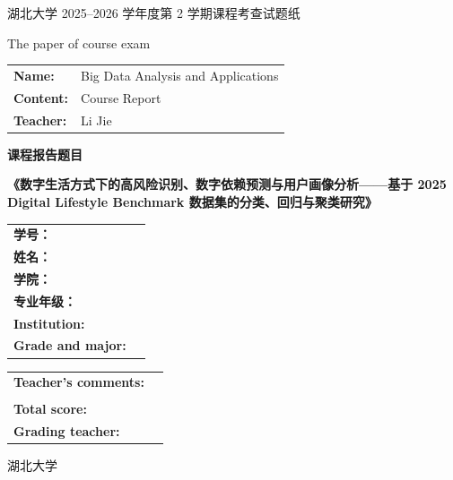\begin{titlepage}
\thispagestyle{empty}
\centering

{\Large 湖北大学 2025--2026 学年度第 2 学期课程考查试题纸\par}
\vspace{0.4cm}
{\large The paper of course exam\par}

\vspace{1.2cm}

\begin{tabular}{>{\bfseries}p{3.2cm}p{9.5cm}}
Name: & Big Data Analysis and Applications \\
Content: & Course Report \\
Teacher: & Li Jie \\
\end{tabular}

\vspace{1.4cm}

{\Large\bfseries 课程报告题目\par}
\vspace{0.6cm}
{\large\bfseries
《数字生活方式下的高风险识别、数字依赖预测与用户画像分析——基于 2025 Digital Lifestyle Benchmark 数据集的分类、回归与聚类研究》\par}

\vfill

\begingroup
\renewcommand{\arraystretch}{1.6}
\begin{tabular}{>{\bfseries}p{4.1cm}p{6.9cm}}
学号： & \underline{\hspace{6.4cm}} \\
姓名： & \underline{\hspace{6.4cm}} \\
学院： & \underline{\hspace{6.4cm}} \\
专业年级： & \underline{\hspace{6.4cm}} \\
Institution: & \underline{\hspace{6.4cm}} \\
Grade and major: & \underline{\hspace{6.4cm}} \\
\end{tabular}
\endgroup

\vspace{0.9cm}

\begingroup
\renewcommand{\arraystretch}{1.6}
\begin{tabular}{>{\bfseries}p{5cm}p{6cm}}
Teacher's comments: & \underline{\hspace{5.8cm}} \\
 & \underline{\hspace{5.8cm}} \\
Total score: & \underline{\hspace{5.8cm}} \\
Grading teacher: & \underline{\hspace{5.8cm}} \\
\end{tabular}
\endgroup

\vspace{0.9cm}

{\large 湖北大学\par}

\end{titlepage}
\clearpage
